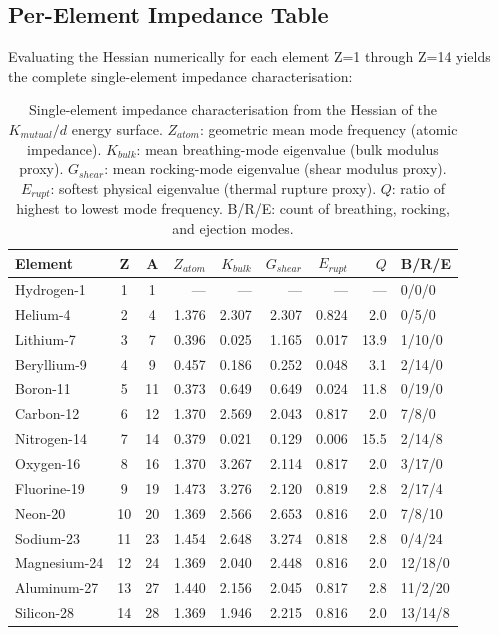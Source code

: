 \subsection{Per-Element Impedance Table}

Evaluating the Hessian numerically for each element Z=1 through Z=14 yields the complete single-element impedance characterisation:

\begin{table}[h!]
    \centering
    \small
    \begin{tabular}{l c c r r r r r l}
    \hline\hline
    \textbf{Element} & \textbf{Z} & \textbf{A} & $Z_{atom}$ & $K_{bulk}$ & $G_{shear}$ & $E_{rupt}$ & $Q$ & \textbf{B/R/E} \\
    \hline
    Hydrogen-1  & 1  & 1  & ---    & ---    & ---    & ---    & --- & 0/0/0  \\
    Helium-4    & 2  & 4  & 1.376  & 2.307  & 2.307  & 0.824  & 2.0 & 0/5/0  \\
    Lithium-7   & 3  & 7  & 0.396  & 0.025  & 1.165  & 0.017  & 13.9 & 1/10/0 \\
    Beryllium-9 & 4  & 9  & 0.457  & 0.186  & 0.252  & 0.048  & 3.1 & 2/14/0 \\
    Boron-11    & 5  & 11 & 0.373  & 0.649  & 0.649  & 0.024  & 11.8 & 0/19/0 \\
    Carbon-12   & 6  & 12 & 1.370  & 2.569  & 2.043  & 0.817  & 2.0 & 7/8/0  \\
    Nitrogen-14 & 7  & 14 & 0.379  & 0.021  & 0.129  & 0.006  & 15.5 & 2/14/8 \\
    Oxygen-16   & 8  & 16 & 1.370  & 3.267  & 2.114  & 0.817  & 2.0 & 3/17/0 \\
    Fluorine-19 & 9  & 19 & 1.473  & 3.276  & 2.120  & 0.819  & 2.8 & 2/17/4 \\
    Neon-20     & 10 & 20 & 1.369  & 2.566  & 2.653  & 0.816  & 2.0 & 7/8/10 \\
    Sodium-23   & 11 & 23 & 1.454  & 2.648  & 3.274  & 0.818  & 2.8 & 0/4/24 \\
    Magnesium-24 & 12 & 24 & 1.369 & 2.040  & 2.448  & 0.816  & 2.0 & 12/18/0 \\
    Aluminum-27 & 13 & 27 & 1.440  & 2.156  & 2.045  & 0.817  & 2.8 & 11/2/20 \\
    Silicon-28  & 14 & 28 & 1.369  & 1.946  & 2.215  & 0.816  & 2.0 & 13/14/8 \\
    \hline\hline
    \end{tabular}
    \caption{Single-element impedance characterisation from the Hessian of the $K_{mutual}/d$ energy surface. $Z_{atom}$: geometric mean mode frequency (atomic impedance). $K_{bulk}$: mean breathing-mode eigenvalue (bulk modulus proxy). $G_{shear}$: mean rocking-mode eigenvalue (shear modulus proxy). $E_{rupt}$: softest physical eigenvalue (thermal rupture proxy). $Q$: ratio of highest to lowest mode frequency. B/R/E: count of breathing, rocking, and ejection modes.}
    \label{tab:element_impedance}
\end{table}

